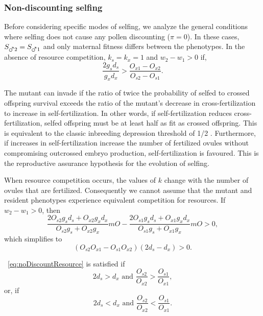 \documentclass[letterpaper,titlepage]{scrartcl}
\begin{document}
\subsubsection{Non-discounting selfing}
Before considering specific modes of selfing, we analyze the general
conditions where selfing does not cause any pollen discounting
($\pi=0$). In these cases, $S_{\mars2}=S_{\mars1}$ and only maternal
fitness differs between the phenotypes. In the absence of resource
competition, $k_{s}=k_{x}=1$ and $w_{2}-w_{1}>0$ if,
\begin{equation}\label{eq:noDiscountNoResource}
  \frac{2g_{s}d_{s}}{g_{x}d_{x}}>\frac{O_{x1}-O_{x2}}{O_{s2}-O_{s1}}.
\end{equation}

The mutant can invade if the ratio of twice the probability of
selfed to crossed offspring survival exceeds the ratio of the mutant's
decrease in cross-fertilization to increase in self-fertilization. In
other words, if self-fertilization reduces cross-fertilization, selfed
offspring must be at least half as fit as crossed offspring. This is
equivalent to the classic inbreeding depression threshold of 1/2
\citep{Lloyd79,Lande85}. Furthermore, if increases in
self-fertilization increase the number of fertilized ovules without
compromising outcrossed embryo production, self-fertilization is
favoured. This is the reproductive assurance hypothesis for the
evolution of selfing.

When resource competition occurs, the values of $k$ change with the
number of ovules that are fertilized. Consequently we cannot assume
that the mutant and resident phenotypes experience equivalent
competition for resources. If $w_{2}-w_{1}>0$, then
\begin{equation*}
  \frac{2O_{s2}g_{s}d_{s}+O_{x2}g_{x}d_{x}}{O_{s2}g_{s}+O_{x2}g_{x}}mO - \frac{2O_{s1}g_{s}d_{s}+O_{x1}g_{x}d_{x}}{O_{s1}g_{s}+O_{x1}g_{x}}mO>0,
\end{equation*}
which simplifies to
\begin{equation}\label{eq:noDiscountResource}
  (O_{s2}O_{x1}-O_{s1}O_{x2})(2d_{s}-d_{x})>0.
\end{equation}

{\eref}~\ref{eq:noDiscountResource} is satisfied if
\begin{equation}\label{eq:noDiscountResourceCondition1}
  2d_{s}>d_{x} \text{ and } \frac{O_{s2}}{O_{x2}}>\frac{O_{s1}}{O_{x1}},
\end{equation}
or, if
\begin{equation}\label{eq:noDiscountResourceCondition2}
  2d_{s}<d_{x} \text{ and } \frac{O_{s2}}{O_{x2}}<\frac{O_{s1}}{O_{x1}}.
\end{equation}
\end{document}
